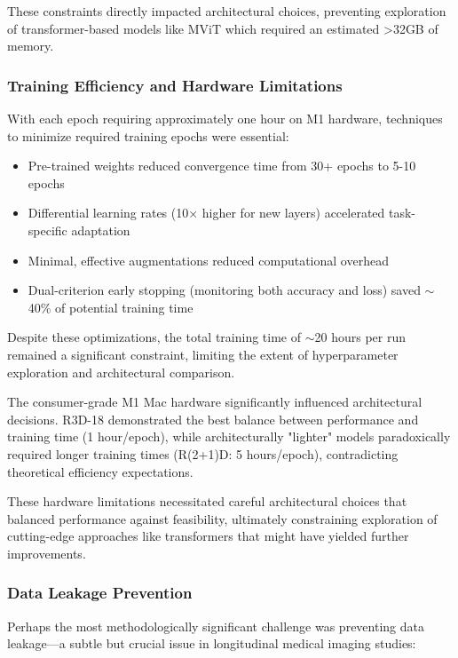 \documentclass[12pt, a4paper]{article}
\begin{document}
These constraints directly impacted architectural choices, preventing exploration of transformer-based models like MViT which required an estimated >32GB of memory.

\subsubsection{Training Efficiency and Hardware Limitations}

With each epoch requiring approximately one hour on M1 hardware, techniques to minimize required training epochs were essential:

\begin{itemize}
    \item Pre-trained weights reduced convergence time from 30+ epochs to 5-10 epochs
    \item Differential learning rates (10× higher for new layers) accelerated task-specific adaptation
    \item Minimal, effective augmentations reduced computational overhead
    \item Dual-criterion early stopping (monitoring both accuracy and loss) saved $\sim$40\% of potential training time
\end{itemize}

Despite these optimizations, the total training time of $\sim$20 hours per run remained a significant constraint, limiting the extent of hyperparameter exploration and architectural comparison.

The consumer-grade M1 Mac hardware significantly influenced architectural decisions. R3D-18 demonstrated the best balance between performance and training time (1 hour/epoch), while architecturally "lighter" models paradoxically required longer training times (R(2+1)D: 5 hours/epoch), contradicting theoretical efficiency expectations.

These hardware limitations necessitated careful architectural choices that balanced performance against feasibility, ultimately constraining exploration of cutting-edge approaches like transformers that might have yielded further improvements.

\subsubsection{Data Leakage Prevention}

Perhaps the most methodologically significant challenge was preventing data leakage—a subtle but crucial issue in longitudinal medical imaging studies:
\end{document}
